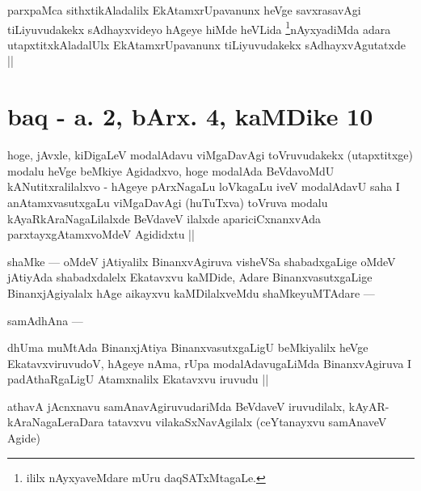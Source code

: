 \begin{artha}
parxpaMca sithxtikAladalilx EkAtamxrUpavanunx heVge savxrasavAgi tiLiyuvudakekx sAdhayxvideyo hAgeye hiMde heVLida \footnote[1]{ililx nAyxyaveMdare mUru daqSATxMtagaLe.}nAyxyadiMda adara utapxtitxkAladalUlx EkAtamxrUpavanunx tiLiyuvudakekx sAdhayxvAgutatxde ||
\end{artha}

\section*{baq - a. 2, bArx. 4, kaMDike 10}


\begin{artha}
hoge, jAvxle, kiDigaLeV modalAdavu viMgaDavAgi toVruvudakekx (utapxtitxge) modalu heVge beMkiye Agidadxvo, hoge modalAda BeVdavoMdU kANutitxralilalxvo - hAgeye pArxNagaLu loVkagaLu iveV modalAdavU saha I anAtamxvasutxgaLu viMgaDavAgi (huTuTxva) toVruva modalu kAyaRkAraNagaLilalxde BeVdaveV ilalxde apariciCxnanxvAda parxtayxgAtamxvoMdeV Agididxtu ||
\end{artha}

\begin{artha}
shaMke --- oMdeV jAtiyalilx BinanxvAgiruva visheVSa shabadxgaLige oMdeV jAtiyAda shabadxdalelx Ekatavxvu kaMDide, Adare BinanxvasutxgaLige BinanxjAgiyalalx hAge aikayxvu kaMDilalxveMdu shaMkeyuMTAdare ---
\end{artha}

\begin{artha}
samAdhAna ---
\end{artha}

\begin{artha}
dhUma muMtAda BinanxjAtiya BinanxvasutxgaLigU beMkiyalilx heVge EkatavxviruvudoV, hAgeye nAma, rUpa modalAdavugaLiMda BinanxvAgiruva I padAthaRgaLigU Atamxnalilx Ekatavxvu iruvudu ||
\end{artha}


\begin{artha}
athavA jAcnxnavu samAnavAgiruvudariMda BeVdaveV iruvudilalx, kAyAR-kAraNagaLeraDara tatavxvu vilakaSxNavAgilalx (ceYtanayxvu samAnaveV Agide)
\end{artha}

